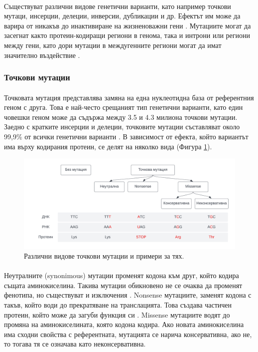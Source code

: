 \documentclass[pdftex,cyrillic,14pt,a4page,twoside,openright]{extreport}
\begin{document}
\paragraph{}
Съществуват различни видове генетични варианти, като например точкови мутаци, инсерции, делеции, инверсии, дубликации и др. Ефектът им може да варира от никакъв до инактивиране на жизненоважни гени \cite{taiping1998}. Мутациите могат да засегнат както протеин-кодиращи региони в генома, така и интрони или региони между гени, като дори мутации в междугенните региони могат да имат значително въздействие \cite{zou2020}.

\subsubsection{Точкови мутации}
\paragraph{}
Точковата мутация представлява замяна на една нуклеотидна база от референтния геном с друга. Това е най-често срещаният тип генетични варианти, като един човешки геном може да съдържа между 3.5 и 4.3 милиона точкови мутации. Заедно с кратките инсерции и делеции, точковите мутации съставляват около 99,9\% от всички генетични варианти \cite{auton2015}. В зависимост от ефекта, който вариантът има върху кодирания протеин, се делят на няколко вида (Фигура \ref{fig:snp_types}).

\begin{figure}[h]
  \centering
  \includegraphics[width=17cm]{figures/snp_types}
  \caption {Различни видове точкови мутации и примери за тях.}
  \label{fig:snp_types}
\end{figure}

\paragraph{}
Неутралните (synonimous) мутации променят кодона към друг, който кодира същата аминокиселина. Такива мутации обикновено не се очаква да променят фенотипа, но съществуват и изключения \cite{kimchi2007}. Nonsense мутациите, заменят кодона с такъв, който води до прекратяване на транслацията. Това създава частичен протеин, който може да загуби функция си \cite{bidou2012}. Missense мутациите водят до промяна на аминокиселината, която кодона кодира. Ако новата аминокиселина има сходни свойства с референтната, мутацията се нарича консервативна, ако не, то тогава тя се означава като неконсервативна.
\end{document}
